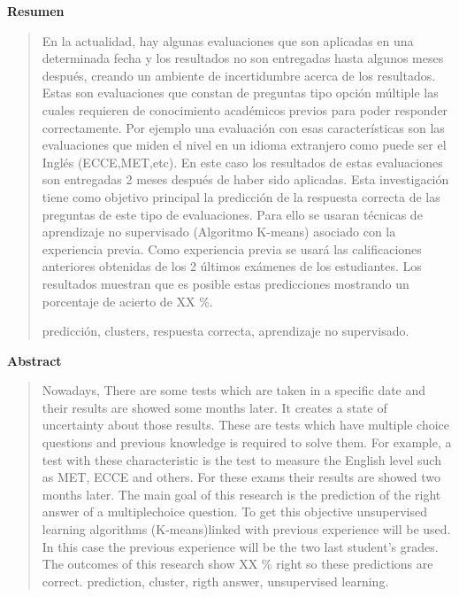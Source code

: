 \newpage
\begin{center}
 {\bf\LARGE Resumen}
\end{center} 
\begin{quotation}
\vskip 0.5cm
En la actualidad, hay algunas evaluaciones que son aplicadas en una determinada fecha y los resultados no son entregadas hasta algunos meses después, creando un ambiente de incertidumbre acerca de los resultados. Estas son evaluaciones que constan  de  preguntas  tipo  opción  múltiple  las  cuales  requieren  de  conocimiento académicos previos para poder responder correctamente. Por ejemplo una evaluación con esas características son las evaluaciones que miden el nivel en un idioma extranjero  como  puede  ser  el  Inglés  (ECCE,MET,etc).  En  este  caso  los  resultados de estas evaluaciones son entregadas 2 meses después de haber sido aplicadas.
\vskip 0.2cm 
Esta investigación tiene como objetivo principal la predicción de la respuesta correcta de las preguntas de este tipo de evaluaciones. Para ello se usaran técnicas de aprendizaje no supervisado (Algoritmo K-means) asociado con la experiencia previa. Como experiencia previa se usará las calificaciones anteriores obtenidas de los 2 últimos exámenes de los estudiantes. Los resultados muestran que es posible estas predicciones mostrando un porcentaje de acierto de XX \%.

\vskip 0.3cm
\hspace*{-0.6cm}{\bf Palabras claves:} predicción, clusters, respuesta correcta, aprendizaje no supervisado.
\end{quotation}


\newpage
\begin{center}
 {\bf\LARGE Abstract}\vskip 1.5cm
\end{center} 
\begin{quotation}

Nowadays, There are some tests which are taken in a specific date and their results are showed some months later. It creates a state of uncertainty about those results. These are tests which have multiple choice questions and previous knowledge is required to solve them. For example, a test with these characteristic is the test to measure the English level such as MET, ECCE and others. For these exams their results are showed two months later. 
\vskip 0.2cm
The main goal of this research is the prediction of the right answer of a multiplechoice question. To get this objective unsupervised learning algorithms (K-means)linked with previous experience will be used. In this case the previous experience will be the two last student’s grades.
The outcomes of this research show XX \% right so these predictions are correct.
\vskip 0.3cm
\hspace*{-0.6cm}{\bf Keywords:} prediction, cluster, rigth answer, unsupervised learning.
\end{quotation}


